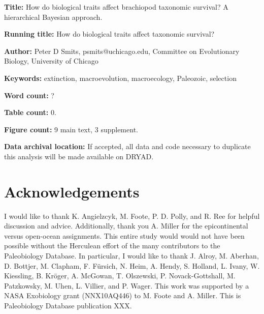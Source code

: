 \documentclass{article}
\begin{document}
\linenumbers
\modulolinenumbers[2]


\begin{titlepage}
  \begin{large}
    \textbf{Title:} How do biological traits affect brachiopod taxonomic survival? A hierarchical Bayesian approach.
  \end{large}

  \textbf{Running title:} How do biological traits affect taxonomic survival?

  \textbf{Author:} Peter D Smits, psmits@uchicago.edu, Committee on Evolutionary Biology, University of Chicago

  \textbf{Keywords:} extinction, macroevolution, macroecology, Paleozoic, selection

  \textbf{Word count:} ?
  
  \textbf{Table count:} 0.
 
  \textbf{Figure count:} 9 main text, 3 supplement.

  \textbf{Data archival location:} If accepted, all data and code necessary to duplicate this analysis will be made available on DRYAD.

\end{titlepage}











\section*{Acknowledgements}
I would like to thank K. Angielzcyk, M. Foote, P. D. Polly, and R. Ree for helpful discussion and advice. Additionally, thank you A. Miller for the epicontinental versus open-ocean assignments. This entire study would would not have been possible without the Herculean effort of the many contributors to the Paleobiology Database. In particular, I would like to thank J. Alroy, M. Aberhan, D. Bottjer, M. Clapham, F. F\"{u}rsich, N. Heim, A. Hendy, S. Holland, L. Ivany, W. Kiessling, B. Kr\"{o}ger, A. McGowan, T. Olszewski, P. Novack-Gottshall, M. Patzkowsky, M. Uhen, L. Villier, and P. Wager. This work was supported by a NASA Exobiology grant (NNX10AQ446) to M. Foote and A. Miller. This is Paleobiology Database publication XXX.

\clearpage




\clearpage

\appendix

\end{document}
